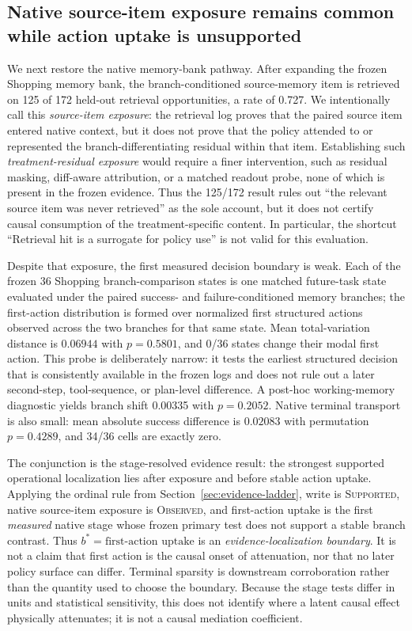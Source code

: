 \subsection{Native source-item exposure remains common while action uptake is unsupported}
We next restore the native memory-bank pathway. After expanding the frozen Shopping memory bank, the branch-conditioned source-memory item is retrieved on 125 of 172 held-out retrieval opportunities, a rate of 0.727. We intentionally call this \emph{source-item exposure}: the retrieval log proves that the paired source item entered native context, but it does not prove that the policy attended to or represented the branch-differentiating residual within that item. Establishing such \emph{treatment-residual exposure} would require a finer intervention, such as residual masking, diff-aware attribution, or a matched readout probe, none of which is present in the frozen evidence. Thus the 125/172 result rules out ``the relevant source item was never retrieved'' as the sole account, but it does not certify causal consumption of the treatment-specific content. In particular, the shortcut ``Retrieval hit is a surrogate for policy use'' is not valid for this evaluation.

Despite that exposure, the first measured decision boundary is weak. Each of the frozen 36 Shopping branch-comparison states is one matched future-task state evaluated under the paired success- and failure-conditioned memory branches; the first-action distribution is formed over normalized first structured actions observed across the two branches for that same state. Mean total-variation distance is $0.06944$ with $p=0.5801$, and 0/36 states change their modal first action. This probe is deliberately narrow: it tests the earliest structured decision that is consistently available in the frozen logs and does not rule out a later second-step, tool-sequence, or plan-level difference. A post-hoc working-memory diagnostic yields branch shift 0.00335 with $p=0.2052$. Native terminal transport is also small: mean absolute success difference is $0.02083$ with permutation $p=0.4289$, and 34/36 cells are exactly zero.

The conjunction is the stage-resolved evidence result: the strongest supported operational localization lies after exposure and before stable action uptake. Applying the ordinal rule from Section~\ref{sec:evidence-ladder}, write is \textsc{Supported}, native source-item exposure is \textsc{Observed}, and first-action uptake is the first \emph{measured} native stage whose frozen primary test does not support a stable branch contrast. Thus $b^*=\text{first-action uptake}$ is an \emph{evidence-localization boundary}. It is not a claim that first action is the causal onset of attenuation, nor that no later policy surface can differ. Terminal sparsity is downstream corroboration rather than the quantity used to choose the boundary. Because the stage tests differ in units and statistical sensitivity, this does not identify where a latent causal effect physically attenuates; it is not a causal mediation coefficient.

